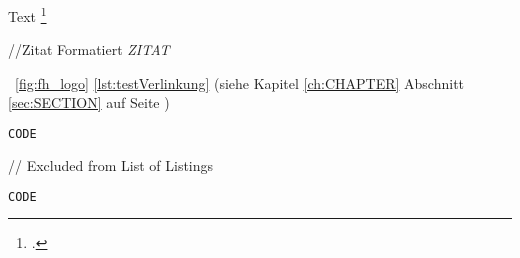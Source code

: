 \textit{}           %
\textbf{} \newline  %
\glqq Text\grqq{}   %
\quotations{}       %
\catchphrase{}      %
\autocite { Toussaint 2013}                 %
\autocite [17]{ Toussaint 2013}             %
\autocite [ vgl .][17]{ Toussaint 2013}     %
\autocite [ vgl .][]{ Toussaint 2013}       %
\cite { Toussaint 2013}                     %
\footcite { Toussaint 2013}                 %
\parencite *{ Toussaint 2013}               %

\begin{center} //Zitat Formatiert
    \textit{\glqq ZITAT \grqq{}}
\end{center}


~\ref{fig:fh_logo}
\ref{lst:testVerlinkung}
\pageref{fig:test}
(siehe Kapitel \ref{ch:CHAPTER} Abschnitt \ref{sec:SECTION} auf Seite \pageref{sec:SECTION})



\begin{lstlisting}[caption={REPLACECODE},label={lst:replaceCode}, language=kotlin]
CODE
\end{lstlisting}

// Excluded from List of Listings
\begin{lstlisting}[caption={REPLACECODE},nolol,label={lst:replaceCode}, language=kotlin]
CODE
\end{lstlisting}


